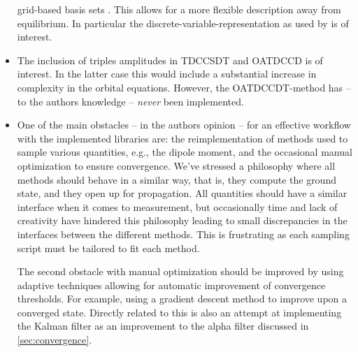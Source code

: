 \begin{itemize}
                    grid-based basis sets \cite{takeshi, miyagi_and_madsen,
                    hochstuhl2014time}.
                    This allows for a more flexible description away from
                    equilibrium.
                    In particular the discrete-variable-representation as used
                    by \citeauthor{miyagi_and_madsen} \cite{miyagi_and_madsen}
                    is of interest.
                \item The inclusion of triples amplitudes in TDCCSDT and OATDCCD
                    is of interest.
                    In the latter case this would include a substantial
                    increase in complexity in the orbital equations.
                    However, the OATDCCDT-method has -- to the authors knowledge
                    -- \emph{never} been implemented.
                \item One of the main obstacles -- in the authors opinion -- for
                    an effective workflow with the implemented libraries are: the
                    reimplementation of methods used to sample various
                    quantities, e.g., the dipole moment, and the occasional
                    manual optimization to ensure convergence.
                    We've stressed a philosophy where all methods should behave
                    in a similar way, that is, they compute the ground state,
                    and they open up for propagation.
                    All quantities should have a similar interface when it comes
                    to measurement, but occasionally time and lack of creativity
                    have hindered this philosophy leading to small discrepancies
                    in the interfaces between the different methods.
                    This is frustrating as each sampling script must be tailored
                    to fit each method.

                    The second obstacle with manual optimization should be
                    improved by using adaptive techniques allowing for automatic
                    improvement of convergence thresholds.
                    For example, using a gradient descent method to improve upon
                    a converged state.
                    Directly related to this is also an attempt at implementing
                    the Kalman filter as an improvement to the alpha filter
                    discussed in \autoref{sec:convergence}.
            \end{itemize}

